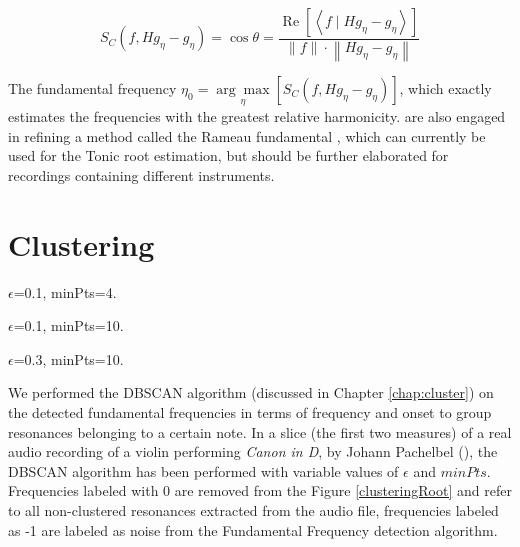 \begin{equation} 
S_C\left(f, H g_\eta-g_\eta\right)=\cos \theta=\frac{\operatorname{Re}\left[\left\langle f \mid H g_\eta-g_\eta\right\rangle\right]}{\|f\| \cdot\left\|H g_\eta-g_\eta\right\|}
\end{equation}

The fundamental frequency $\eta_0=\underset{\eta}{\arg \max }\left[S_C\left(f, H g_\eta-g_\eta\right)\right]$, which exactly estimates the frequencies with the greatest relative harmonicity.
\textcite{homer_modelling_2023} are also engaged in refining a method called the Rameau fundamental \sidenotemark{}, which can currently be used for the Tonic root estimation, but should be further elaborated for recordings containing different instruments.


\section{Clustering}

\begin{marginfigure}
\centering
\vspace{1cm}

\caption{$\epsilon$=0.1, minPts=4.}
\label{a} 
\end{marginfigure}


\begin{marginfigure}
\centering
\vspace{0.3cm}

\caption{$\epsilon$=0.1, minPts=10.}
\label{b} 
\end{marginfigure}

\begin{marginfigure}
\centering
\vspace{0.3cm}

\caption{$\epsilon$=0.3, minPts=10.}
\label{c} 
\end{marginfigure}





We performed the DBSCAN algorithm (discussed in Chapter \ref{chap:cluster}) on the detected fundamental frequencies in terms of frequency and onset to group resonances belonging to a certain note. In a slice (the first two measures) of a real audio recording of a violin performing \textit{Canon in D}, by Johann Pachelbel (\cite{bridget_stringspace_2019}), the DBSCAN algorithm has been performed with variable values of $\epsilon$ and $minPts$. Frequencies labeled with 0 are removed from the Figure \ref{clusteringRoot} and refer to all non-clustered resonances extracted from the audio file, frequencies labeled as -1 are labeled as noise from the Fundamental Frequency detection algorithm. 

